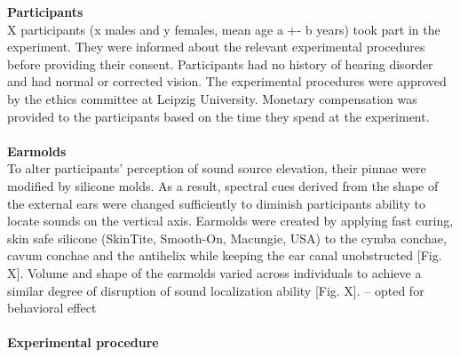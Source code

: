 \textbf{Participants}\\
X participants (x males and y females, mean age a +- b years) took part in the experiment.
They were informed about the relevant experimental procedures before providing their consent. Participants had no history of hearing disorder and had normal or corrected vision. The experimental procedures were approved by the ethics committee at Leipzig University.  Monetary compensation was provided to the participants based on the time they spend at the experiment.
\\\\
\textbf{Earmolds}\\
To alter participants’ perception of sound source elevation, their pinnae were modified by silicone molds. As a result, spectral cues derived from the shape of the external ears were changed sufficiently to diminish participants ability to locate sounds on the vertical axis. Earmolds were created by applying fast curing, skin safe silicone (SkinTite, Smooth-On, Macungie, USA) to the cymba conchae, cavum conchae and the antihelix while keeping the ear canal unobstructed [Fig. X]. Volume and shape of the earmolds varied across individuals to achieve a similar degree of disruption of sound localization ability [Fig. X]. – opted for behavioral effect\\\\
\textbf{Experimental procedure}\\
